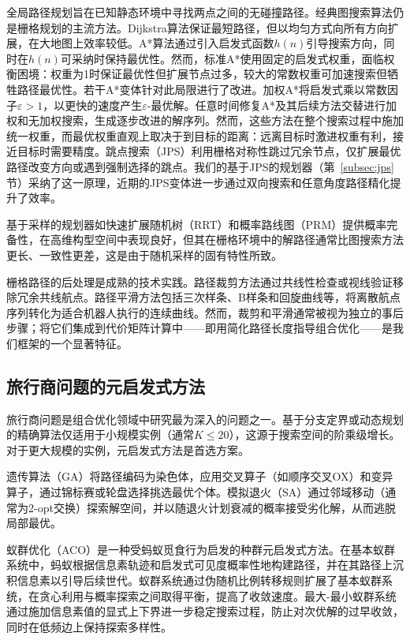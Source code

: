 \documentclass[lettersize,journal]{IEEEtran}
\begin{document}
全局路径规划旨在已知静态环境中寻找两点之间的无碰撞路径。经典图搜索算法仍是栅格规划的主流方法。Dijkstra算法保证最短路径，但以均匀方式向所有方向扩展，在大地图上效率较低\cite{ref6}。A*算法通过引入启发式函数$h(n)$引导搜索方向，同时在$h(n)$可采纳时保持最优性\cite{ref5}。然而，标准A*使用固定的启发式权重，面临权衡困境：权重为1时保证最优性但扩展节点过多，较大的常数权重可加速搜索但牺牲路径最优性。若干A*变体针对此局限进行了改进\cite{ref8}。加权A*将启发式乘以常数因子$\varepsilon > 1$，以更快的速度产生$\varepsilon$-最优解\cite{ref9}。任意时间修复A*及其后续方法交替进行加权和无加权搜索，生成逐步改进的解序列\cite{ref10}。然而，这些方法在整个搜索过程中施加统一权重，而最优权重直观上取决于到目标的距离：远离目标时激进权重有利，接近目标时需要精度。跳点搜索（JPS）利用栅格对称性跳过冗余节点，仅扩展最优路径改变方向或遇到强制选择的跳点\cite{ref11,ref12}。我们的基于JPS的规划器（第~\textcolor{blue}{\ref{subsec:jps}} 节）采纳了这一原理，近期的JPS变体进一步通过双向搜索和任意角度路径精化提升了效率\cite{ref13,ref14,ref15}。

基于采样的规划器如快速扩展随机树（RRT）\cite{ref7}和概率路线图（PRM）提供概率完备性，在高维构型空间中表现良好，但其在栅格环境中的解路径通常比图搜索方法更长、一致性更差，这是由于随机采样的固有特性所致。

栅格路径的后处理是成熟的技术实践。路径裁剪方法通过共线性检查或视线验证移除冗余共线航点\cite{ref16}。路径平滑方法包括三次样条、B样条和回旋曲线等，将离散航点序列转化为适合机器人执行的连续曲线\cite{ref17,ref18}。然而，裁剪和平滑通常被视为独立的事后步骤；将它们集成到代价矩阵计算中——即用简化路径长度指导组合优化——是我们框架的一个显著特征。

\subsection{旅行商问题的元启发式方法}

旅行商问题是组合优化领域中研究最为深入的问题之一。基于分支定界或动态规划的精确算法仅适用于小规模实例（通常$K \leq 20$），这源于搜索空间的阶乘级增长。对于更大规模的实例，元启发式方法是首选方案。

遗传算法（GA）将路径编码为染色体，应用交叉算子（如顺序交叉OX）和变异算子，通过锦标赛或轮盘选择挑选最优个体\cite{ref19}。模拟退火（SA）通过邻域移动（通常为2-opt交换）探索解空间，并以随退火计划衰减的概率接受劣化解，从而逃脱局部最优\cite{ref20}。

蚁群优化（ACO）是一种受蚂蚁觅食行为启发的种群元启发式方法。在基本蚁群系统中，蚂蚁根据信息素轨迹和启发式可见度概率性地构建路径，并在其路径上沉积信息素以引导后续世代\cite{ref21}。蚁群系统通过伪随机比例转移规则扩展了基本蚁群系统，在贪心利用与概率探索之间取得平衡，提高了收敛速度\cite{ref22}。最大-最小蚁群系统通过施加信息素值的显式上下界进一步稳定搜索过程，防止对次优解的过早收敛，同时在低频边上保持探索多样性\cite{ref23}。
\end{document}
